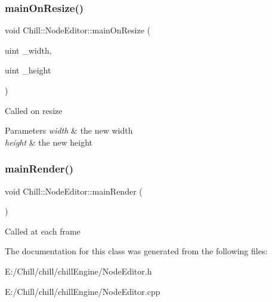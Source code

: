 \subsubsection{\texorpdfstring{main\+On\+Resize()}{mainOnResize()}}
{\footnotesize\ttfamily void Chill\+::\+Node\+Editor\+::main\+On\+Resize (\begin{DoxyParamCaption}\item[{uint}]{\+\_\+width,  }\item[{uint}]{\+\_\+height }\end{DoxyParamCaption})\hspace{0.3cm}{\ttfamily [static]}}

Called on resize 
\begin{DoxyParams}{Parameters}
{\em width} & the new width \\
\hline
{\em height} & the new height \\
\hline
\end{DoxyParams}
\mbox{\label{class_chill_1_1_node_editor_accabf149df9cb481956ef3c0132252f8}} 
\subsubsection{\texorpdfstring{main\+Render()}{mainRender()}}
{\footnotesize\ttfamily void Chill\+::\+Node\+Editor\+::main\+Render (\begin{DoxyParamCaption}{ }\end{DoxyParamCaption})\hspace{0.3cm}{\ttfamily [static]}}

Called at each frame 

The documentation for this class was generated from the following files\+:\begin{DoxyCompactItemize}
\item 
E\+:/\+Chill/chill/chill\+Engine/Node\+Editor.\+h\item 
E\+:/\+Chill/chill/chill\+Engine/Node\+Editor.\+cpp\end{DoxyCompactItemize}

